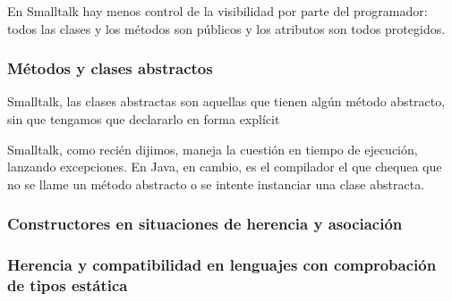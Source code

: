 \documentclass[../main.tex]{subfiles}
\begin{document}
            En Smalltalk hay menos control de la visibilidad por parte del programador: todos las clases y los métodos son públicos y los atributos son todos protegidos.

        \subsubsection{Métodos y clases abstractos}
            Smalltalk, las clases abstractas son aquellas que tienen algún método abstracto, sin que tengamos que declararlo en forma explícit
            
            Smalltalk, como recién dijimos, maneja la cuestión en tiempo de ejecución, lanzando excepciones. En Java, en cambio, es el compilador el que chequea que no se llame un método abstracto o se intente instanciar una clase abstracta.
            
        \subsubsection{Constructores en situaciones de herencia y asociación}
        \subsubsection{Herencia y compatibilidad en lenguajes con comprobación de tipos estática}
\end{document}
